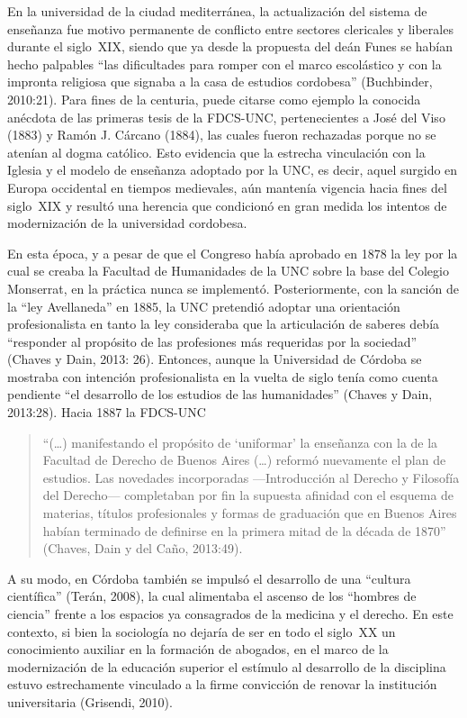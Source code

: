 En la universidad de la ciudad mediterránea, la actualización del sistema de enseñanza fue motivo permanente de conflicto entre sectores clericales y liberales durante el siglo~XIX, siendo que ya desde la propuesta del deán Funes se habían hecho palpables \enquote{las dificultades para romper con el marco escolástico y con la impronta religiosa que signaba a la casa de estudios cordobesa} (Buchbinder, 2010:21). Para fines de la centuria, puede citarse como ejemplo la conocida anécdota de las primeras tesis de la FDCS-UNC, pertenecientes a José del Viso (1883) y Ramón J. Cárcano (1884), las cuales fueron rechazadas porque no se atenían al dogma católico. Esto evidencia que la estrecha vinculación con la Iglesia y el modelo de enseñanza adoptado por la UNC, es decir, aquel surgido en Europa occidental en tiempos medievales, aún mantenía vigencia hacia fines del siglo~XIX y resultó una herencia que condicionó en gran medida los intentos de modernización de la universidad cordobesa.

En esta época, y a pesar de que el Congreso había aprobado en 1878 la ley por la cual se creaba la Facultad de Humanidades de la UNC sobre la base del Colegio Monserrat, en la práctica nunca se implementó. Posteriormente, con la sanción de la \enquote{ley Avellaneda} en 1885, la UNC pretendió adoptar una orientación profesionalista en tanto la ley consideraba que la articulación de saberes debía \enquote{responder al propósito de las profesiones más requeridas por la sociedad} (Chaves y Dain, 2013: 26). Entonces, aunque la Universidad de Córdoba se mostraba con intención profesionalista en la vuelta de siglo tenía como cuenta pendiente \enquote{el desarrollo de los estudios de las humanidades} (Chaves y Dain, 2013:28). Hacia 1887 la FDCS-UNC

\begin{quote}
\enquote{(\dots) manifestando el propósito de \enquote{uniformar} la enseñanza con la de la Facultad de Derecho de Buenos Aires (\dots) reformó nuevamente el plan de estudios. Las novedades incorporadas ---Introducción al Derecho y Filosofía del Derecho--- completaban por fin la supuesta afinidad con el esquema de materias, títulos profesionales y formas de graduación que en Buenos Aires habían terminado de definirse en la primera mitad de la década de 1870} (Chaves, Dain y del Caño, 2013:49).
\end{quote}

A su modo, en Córdoba también se impulsó el desarrollo de una \enquote{cultura científica} (Terán, 2008), la cual alimentaba el ascenso de los \enquote{hombres de ciencia} frente a los espacios ya consagrados de la medicina y el derecho. En este contexto, si bien la sociología no dejaría de ser en todo el siglo~XX un conocimiento auxiliar en la formación de abogados, en el marco de la modernización de la educación superior el estímulo al desarrollo de la disciplina estuvo estrechamente vinculado a la firme convicción de renovar la institución universitaria (Grisendi, 2010).

